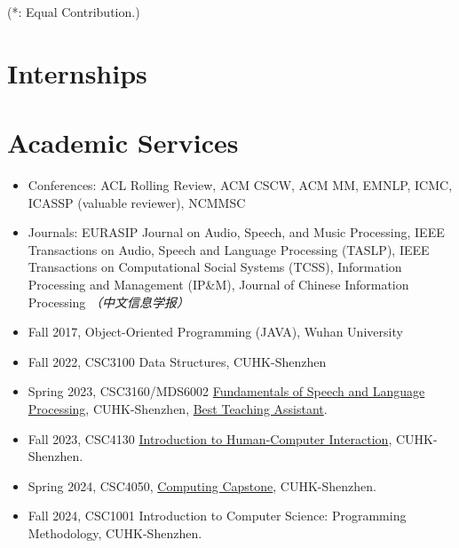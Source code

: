 \documentclass{resume}
\begin{document}
(*: Equal Contribution.)

\section{Internships}
{\small {}
}

{\small {}
}

\section{Academic Services}
\begin{itemize}
  \item Conferences: ACL Rolling Review, ACM CSCW, ACM MM, EMNLP, ICMC, ICASSP (valuable reviewer), NCMMSC
  \item Journals: EURASIP Journal on Audio, Speech, and Music Processing, IEEE
        Transactions on Audio, Speech and Language Processing (TASLP), IEEE
        Transactions on Computational Social Systems (TCSS), Information Processing and
        Management (IP\&M), Journal of Chinese Information Processing \textit{（中文信息学报）}
\end{itemize}
\begin{itemize}
  \item Fall 2017, Object-Oriented Programming (JAVA), Wuhan University
  \item Fall 2022, CSC3100 Data Structures, CUHK-Shenzhen
  \item Spring 2023, CSC3160/MDS6002
        \href{https://drwuz.com/CSC3160/index.html}{Fundamentals of Speech and Language
          Processing}, CUHK-Shenzhen,
        \href{https://www.zhangxueyao.com/data/presentations/20230521_ta_award.pdf}{Best
          Teaching Assistant}.
  \item Fall 2023, CSC4130 \href{https://stevenhan1991.github.io/CSC4130/index.html}{Introduction to Human-Computer Interaction}, CUHK-Shenzhen.
  \item Spring 2024, CSC4050, \href{https://drwuz.com/csc4050/}{Computing Capstone}, CUHK-Shenzhen.
  \item Fall 2024, CSC1001 Introduction to Computer Science: Programming Methodology, CUHK-Shenzhen.
\end{itemize}
\end{document}
